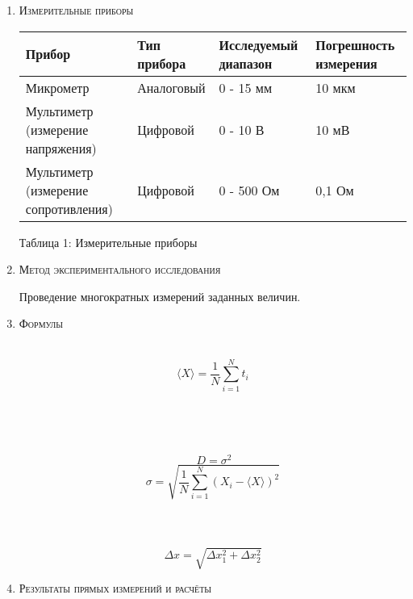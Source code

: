 \documentclass[12pt]{article}
\begin{document}
\begin{enumerate}
    \item \large\textsc{Измерительные приборы}
    \\


     \begin{center}
         
   
      \begin{tabular}{|m{7em}|m{7em}|m{7em}|m{7em}|}
    
       \hline
       Прибор & Тип прибора & Исследуемый диапазон & Погрешность измерения        \\ \hline
       Микрометр & 
       Аналоговый & 0 - 15 мм & 10 мкм\\ \hline
       Мультиметр (измерение напряжения)   & Цифровой & 0 - 10 В & 10 мВ \\ \hline
       Мультиметр (измерение сопротивления)   & Цифровой & 0 - 500 Ом & 0,1 Ом \\ \hline              
      \end{tabular}
     \end{center}   
      \begin{center}
        Таблица 1: Измерительные приборы \\
      \end{center}
    \item \large\textsc{Метод экспериментального исследования}

    Проведение многократных измерений заданных величин.
    

    \item \large\textsc{Формулы}

\\
\begin{equation}
    \langle X \rangle = \frac{1}{N} \sum_{i=1}^{N} t_i
\end{equation}
\\

\\
\\
\\
\begin{equation}
    \ D=\sigma^2 
\end{equation}
\begin{equation}
        \sigma = \sqrt{\frac{1}{N} \sum_{i=1}^{N} (X_i-\langle X \rangle)^2}
\end{equation}
\\
\\
 \\
\begin{equation}
	\Delta x = \sqrt{\Delta x_1^2 + \Delta x_2^2}
\end{equation}
    \item \large\textsc{Результаты прямых  измерений и расчёты}
    

\end{enumerate}
\end{document}
